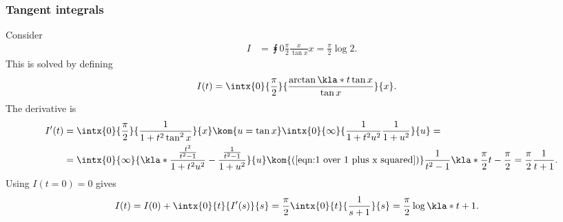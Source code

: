 \documentclass[english, parskip=full]{scrartcl}
\begin{document}
\subsubsection{Tangent integrals}
Consider
\begin{align}
I &= \intx{0}{\frac{\pi}{2}}{\frac{x}{\tan x}}{x} = \frac{\pi}{2} \log 2. \label{eqn:x over tan x}
\end{align}
This is solved by defining
\begin{align}
I(t) &= \intx{0}{\frac{\pi}{2}}{ \frac{\arctan\kla*{t \tan x} }{\tan x}}{x}.
\end{align}
The derivative is
\begin{align}
I'(t) &= \intx{0}{\frac{\pi}{2}}{ \frac{1}{1 + t^2\tan^2 x} }{x} \kom{u = \tan x} \intx{0}{\infty}{ \frac{1}{1 + t^2u^2} \frac{1}{1+u^2} }{u} = \\
&= \intx{0}{\infty }{\kla*{\frac{\frac{t^2}{t^2-1}}{1 + t^2u^2} - \frac{\frac{1}{t^2-1}}{1 + u^2}} }{u} \kom{(\ref{eqn:1 over 1 plus x squared})} \frac{1}{t^2 - 1} \kla*{\frac{\pi}{2}t - \frac{\pi}{2}} = \frac{\pi}{2} \frac{1}{t + 1}.
\end{align}
Using $I(t=0) = 0$ gives
\begin{align}
I(t) &= I(0) + \intx{0}{t}{I'(s) }{s} =  \frac{\pi}{2} \intx{0}{t}{\frac{1}{s+1}}{s} = \frac{\pi}{2} \log\kla*{t+1}. \label{eqn:arctan t tan x over tan x}
\end{align}
\end{document}

